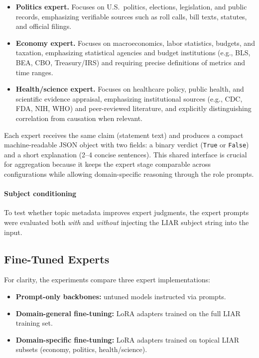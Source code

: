 \begin{itemize}
    \item \textbf{Politics expert.} Focuses on U.S.\ politics, elections, legislation, and public records, emphasizing verifiable sources such as roll calls, bill texts, statutes, and official filings.
    \item \textbf{Economy expert.} Focuses on macroeconomics, labor statistics, budgets, and taxation, emphasizing statistical agencies and budget institutions (e.g., BLS, BEA, CBO, Treasury/IRS) and requiring precise definitions of metrics and time ranges.
    \item \textbf{Health/science expert.} Focuses on healthcare policy, public health, and scientific evidence appraisal, emphasizing institutional sources (e.g., CDC, FDA, NIH, WHO) and peer-reviewed literature, and explicitly distinguishing correlation from causation when relevant.
\end{itemize}

Each expert receives the same claim (statement text) and produces a compact machine-readable JSON object with two fields: a binary verdict (\texttt{True} or \texttt{False}) and a short explanation (2--4 concise sentences). This shared interface is crucial for aggregation because it keeps the expert stage comparable across configurations while allowing domain-specific reasoning through the role prompts.

\paragraph{Subject conditioning}
To test whether topic metadata improves expert judgments, the expert prompts were evaluated both \emph{with} and \emph{without} injecting the LIAR subject string into the input.

\subsection{Fine-Tuned Experts}

For clarity, the experiments compare three expert implementations:
\begin{itemize}
    \item \textbf{Prompt-only backbones:} untuned models instructed via prompts.
    \item \textbf{Domain-general fine-tuning:} LoRA adapters trained on the full LIAR training set.
    \item \textbf{Domain-specific fine-tuning:} LoRA adapters trained on topical LIAR subsets (economy, politics, health/science).
\end{itemize}

